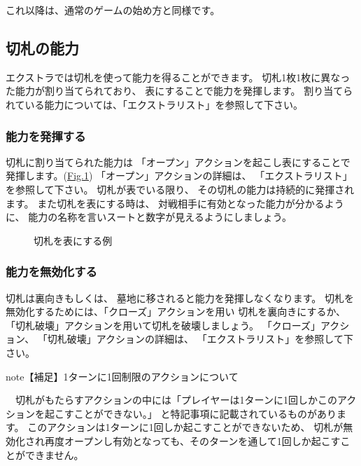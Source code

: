 \documentclass[letterpaper,10pt,dvipdfmx]{sphinxmanual}
\begin{document}
これ以降は、通常のゲームの始め方と同様です。


\subsection{切札の能力}
\label{\detokenize{common/06-extra:id7}}
エクストラでは切札を使って能力を得ることができます。
切札1枚1枚に異なった能力が割り当てられており、
表にすることで能力を発揮します。
割り当てられている能力については、「エクストラリスト」を参照して下さい。


\subsubsection{能力を発揮する}
\label{\detokenize{common/06-extra:id8}}
切札に割り当てられた能力は
「オープン」アクションを起こし表にすることで発揮します。(\hyperref[\detokenize{common/06-extra:trump-open}]{Fig.\@ \ref{\detokenize{common/06-extra:trump-open}}})
「オープン」アクションの詳細は、
「エクストラリスト」を参照して下さい。
切札が表でいる限り、
その切札の能力は持続的に発揮されます。
また切札を表にする時は、
対戦相手に有効となった能力が分かるように、
能力の名称を言いスートと数字が見えるようにしましょう。

\begin{figure}[htbp]
\centering
\capstart

\noindent{}
\caption{切札を表にする例}\label{\detokenize{common/06-extra:id13}}\label{\detokenize{common/06-extra:trump-open}}\end{figure}


\subsubsection{能力を無効化する}
\label{\detokenize{common/06-extra:id9}}
切札は裏向きもしくは、
墓地に移されると能力を発揮しなくなります。
切札を無効化するためには、「クローズ」アクションを用い
切札を裏向きにするか、
「切札破壊」アクションを用いて切札を破壊しましょう。
「クローズ」アクション、
「切札破壊」アクションの詳細は、
「エクストラリスト」を参照して下さい。

\begin{sphinxadmonition}{note}{【補足】1ターンに1回制限のアクションについて}

　切札がもたらすアクションの中には「プレイヤーは1ターンに1回しかこのアクションを起こすことができない。」
と特記事項に記載されているものがあります。
このアクションは1ターンに1回しか起こすことができないため、
切札が無効化され再度オープンし有効となっても、そのターンを通して1回しか起こすことができません。
\end{sphinxadmonition}
\end{document}
